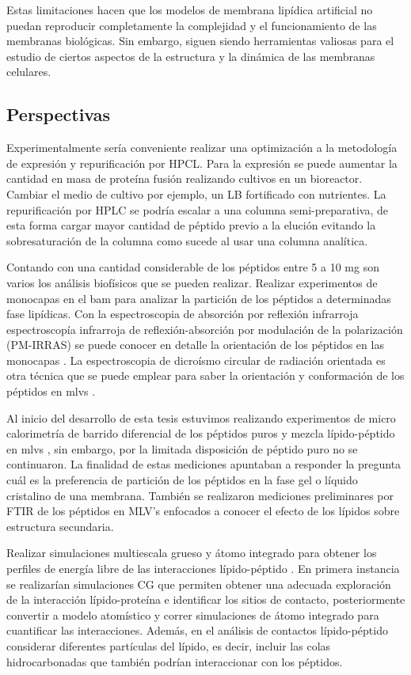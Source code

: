 Estas limitaciones hacen que los modelos de membrana lipídica artificial no puedan reproducir completamente la complejidad y el funcionamiento de las membranas biológicas. Sin embargo, siguen siendo herramientas valiosas para el estudio de ciertos aspectos de la estructura y la dinámica de las membranas celulares.


\subsection{Perspectivas}

Experimentalmente sería conveniente realizar una optimización a la metodología de expresión y repurificación por HPCL. Para la expresión se puede aumentar la cantidad en masa de proteína fusión realizando cultivos en un bioreactor. Cambiar el medio de cultivo por ejemplo, un LB fortificado con nutrientes. La repurificación por HPLC se podría escalar a una columna semi-preparativa, de esta forma cargar mayor cantidad de péptido previo a la elución evitando la sobresaturación de la columna como sucede al usar una columna analítica.

Contando con una cantidad considerable de los péptidos entre 5 a 10 mg son varios los análisis biofísicos que se pueden realizar. Realizar experimentos de monocapas en el \ac{bam} para analizar la partición de los péptidos a determinadas fase lipídicas. Con la espectroscopia de absorción por reflexión infrarroja 
espectroscopía infrarroja de reflexión-absorción por modulación de la polarización (PM-IRRAS) se puede conocer en detalle la orientación de los péptidos en las monocapas \citep{Rabe2014}. La espectroscopia de dicroísmo circular de radiación orientada es otra técnica que se puede emplear para saber la orientación y conformación de los péptidos en \acf{mlvs} \citep{Muruganandam2013}.

Al inicio del desarrollo de esta tesis estuvimos realizando experimentos de micro calorimetría de barrido diferencial de los péptidos puros y mezcla lípido-péptido en \acf{mlvs} , sin embargo, por la limitada disposición de péptido puro no se continuaron. La finalidad de estas mediciones apuntaban a responder la pregunta cuál es la preferencia de partición de los péptidos en la fase gel o líquido cristalino de una membrana. También se realizaron mediciones preliminares por FTIR de los péptidos en MLV's enfocados a conocer el efecto de los lípidos sobre estructura secundaria.

Realizar simulaciones multiescala grueso y átomo integrado para obtener los perfiles de energía libre de las interacciones lípido-péptido \citep{Corey2019, Domanski2017, Hedger2016}. En primera instancia se realizarían simulaciones CG que permiten obtener una adecuada exploración de la interacción lípido-proteína e identificar los sitios de contacto, posteriormente convertir a modelo atomístico y correr simulaciones de átomo integrado para cuantificar las interacciones. Además, en el análisis de contactos lípido-péptido considerar diferentes partículas del lípido, es decir, incluir las colas hidrocarbonadas que también podrían interaccionar con los péptidos.

